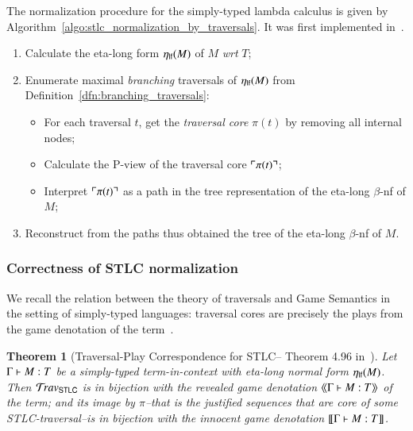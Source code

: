 \documentclass{elsarticle}
\theoremstyle{plain}
\newtheorem{theorem}{Theorem}[section]
\theoremstyle{definition}
\theoremstyle{remark}
\newcommand{\travstlc}{{\travset_{\sf STLC}}}
\def\coresymbol{\pi} %
\newcommand{\core}[1]{\coresymbol(#1)} %
\begin{document}
The normalization procedure for the simply-typed lambda calculus is given by Algorithm~\ref{algo:stlc_normalization_by_traversals}.
It was first implemented in~\cite{BlumGalop2008, Blum-HogTool}.

\begin{algorithm}[!ht]
\caption{Eta-long normalization by traversals for STLC}
\label{algo:stlc_normalization_by_traversals}
\begin{algorithmic}
\begin{enumerate}[nosep]
  \item Calculate the eta-long form $\eta_{\sf lf}(M)$ of $M$ \emph{wrt} $T$;
  \item Enumerate maximal \emph{branching} traversals of $\eta_{\sf lf}(M)$ from Definition~\ref{dfn:branching_traversals}:
  \begin{itemize}[nosep]
  \item For each traversal $t$, get the \emph{traversal core} $\core{t}$ by removing all internal nodes;
  \item Calculate the P-view of the traversal core $\pview{\core{t}}$;
  \item Interpret $\pview{\core{t}}$ as a path in the tree representation of the eta-long $\beta$-nf of $M$;
  \end{itemize}
  \item Reconstruct from the paths thus obtained the tree of the eta-long $\beta$-nf of $M$.
\end{enumerate}
\end{algorithmic}
\end{algorithm}



\subsubsection*{Correctness of STLC normalization}

We recall the relation between the theory of traversals and Game Semantics in the setting of simply-typed languages: traversal cores are precisely the plays from the game denotation of the term~\cite{BlumPhd}.
\begin{theorem}[Traversal-Play Correspondence for STLC-- Theorem 4.96 in~\cite{BlumPhd}]
\label{thm:gamesem_correspondence_stlc}
Let $\Gamma \vdash M :T$ be a simply-typed term-in-context with eta-long normal form $\eta_{\sf lf}(M)$. Then
 $\travstlc$ is in bijection with the \emph{revealed game denotation} ${\langle\!\langle \Gamma \vdash M :T \rangle\!\rangle}$ of the term;
 and its image by $\coresymbol$--that is the justified sequences that are \emph{core} of some STLC-traversal--is in bijection with the innocent game denotation ${[\![ \Gamma \vdash M :T ]\!]}$.
\end{theorem}
\end{document}
